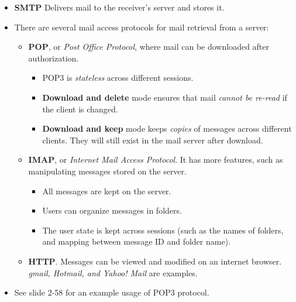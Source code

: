 \documentclass{article}
\begin{document}
\begin{itemize}
\item {\bf SMTP} Delivers mail to the receiver's server and stores it.
\item There are several mail access protocols for mail retrieval from a server:
\begin{itemize}
\item {\bf POP}, or {\it Post Office Protocol}, where mail can be downloaded after authorization.
\begin{itemize}
\item POP3 is {\it stateless} across different sessions.
\item {\bf Download and delete} mode ensures that mail {\it cannot be re-read} if the client is changed.
\item {\bf Download and keep} mode keeps {\it copies} of messages across different clients. They will still exist in the mail server after download.
\end{itemize}
\item {\bf IMAP}, or {\it Internet Mail Access Protocol}. It has more features, such as manipulating messages stored on the server.
\begin{itemize}
\item All messages are kept on the server.
\item Users can organize messages in folders.
\item The user state is kept across sessions (such as the names of folders, and mapping between message ID and folder name).
\end{itemize}
\item {\bf HTTP}. Messages can be viewed and modified on an internet browser. {\it gmail, Hotmail, and Yahoo! Mail} are examples.
\end{itemize}
\item See slide 2-58 for an example usage of POP3 protocol.
\end{itemize}
\end{document}
